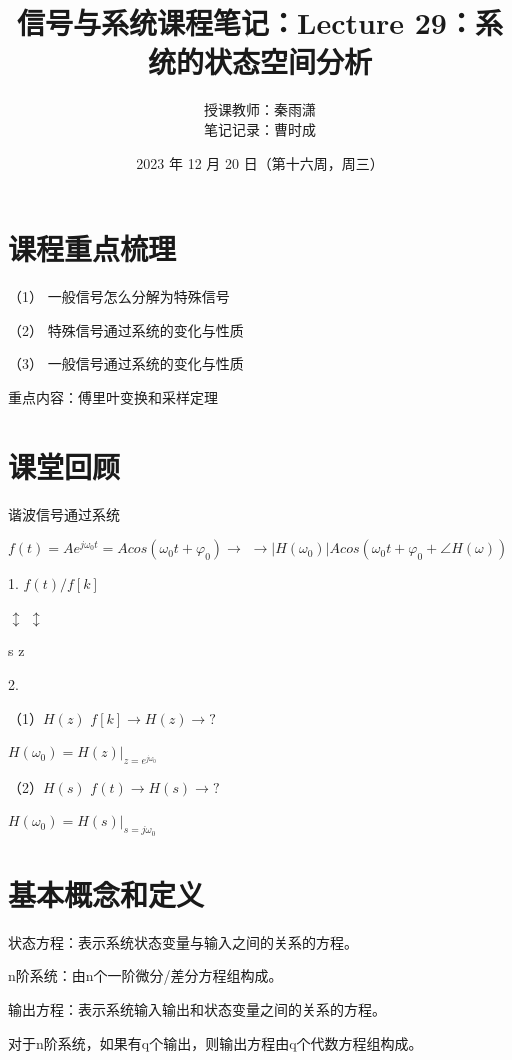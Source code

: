 \documentclass[UTF8]{ctexart}
\begin{document}
\title{信号与系统课程笔记：Lecture 29：系统的状态空间分析}
\author{授课教师：秦雨潇 \\
        笔记记录：曹时成}
\date{2023 年 12 月 20 日（第十六周，周三）}
\maketitle

\section{课程重点梳理}
（1） 一般信号怎么分解为特殊信号  \par
（2） 特殊信号通过系统的变化与性质 \par
（3） 一般信号通过系统的变化与性质 \par
重点内容：傅里叶变换和采样定理 \par

\section{课堂回顾}
谐波信号通过系统 \par
$ f(t)=Ae^{j\omega_0 t}=Acos(\omega_0 t+\varphi_0)\longrightarrow $  $\longrightarrow | H(\omega_0 )\vert Acos(\omega_0 t+\varphi_0+\angle H(\omega ))$ \par
1. $f(t)/f[k]$ \par
\qquad  $\updownarrow $ \quad  $\updownarrow $ \par
\qquad  s \quad z \par
2.  \par
（1）$H(z)$ \qquad $f[k]\longrightarrow H(z) \longrightarrow ?$ \par
\qquad $H(\omega_0)=H(z)\vert_{z=e^{j\omega_0}}$ \par
（2）$H(s)$ \qquad $f(t)\longrightarrow H(s) \longrightarrow ?$ \par
\qquad $H(\omega_0)=H(s)\vert_{s=j\omega_0}$ \par

\section{基本概念和定义}
状态方程：表示系统状态变量与输入之间的关系的方程。 \par
n阶系统：由n个一阶微分/差分方程组构成。 \par
输出方程：表示系统输入输出和状态变量之间的关系的方程。\par
对于n阶系统，如果有q个输出，则输出方程由q个代数方程组构成。\par
\end{document}
